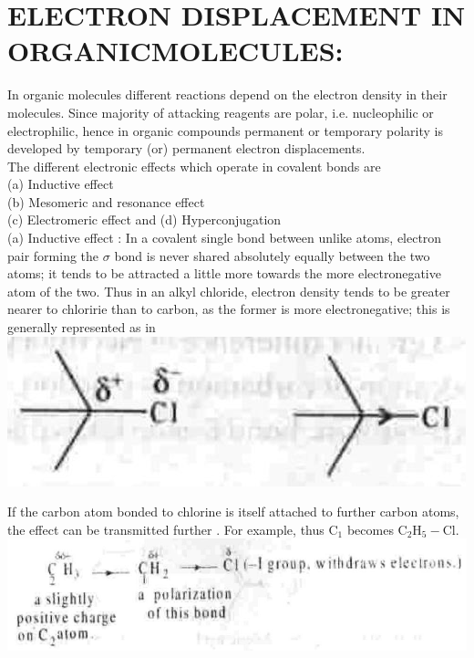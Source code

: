\documentclass[10pt]{article}
\begin{document}
\section*{ELECTRON DISPLACEMENT IN ORGANICMOLECULES:}
In organic molecules different reactions depend on the electron density in their molecules. Since majority of attacking reagents are polar, i.e. nucleophilic or electrophilic, hence in organic compounds permanent or temporary polarity is developed by temporary (or) permanent electron displacements.\\
The different electronic effects which operate in covalent bonds are\\
(a) Inductive effect\\
(b) Mesomeric and resonance effect\\
(c) Electromeric effect and (d) Hyperconjugation\\
(a) Inductive effect : In a covalent single bond between unlike atoms, electron pair forming the $\sigma$ bond is never shared absolutely equally between the two atoms; it tends to be attracted a little more towards the more electronegative atom of the two. Thus in an alkyl chloride, electron density tends to be greater nearer to chloririe than to carbon, as the former is more electronegative; this is generally represented as in\\
\includegraphics[max width=\textwidth, center]{2025_01_28_8470952b98110cec3aabg-066(1)}

If the carbon atom bonded to chlorine is itself attached to further carbon atoms, the effect can be transmitted further . For example, thus $\mathrm{C}_{1}$ becomes $\mathrm{C}_{2} \mathrm{H}_{5}-\mathrm{Cl}$.\\
\includegraphics[max width=\textwidth, center]{2025_01_28_8470952b98110cec3aabg-067(2)}
\end{document}
